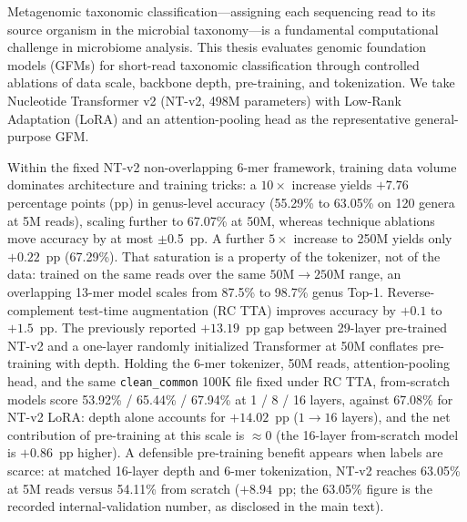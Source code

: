 \begin{abstract*}

    Metagenomic taxonomic classification---assigning each sequencing read to its source organism in the microbial taxonomy---is a fundamental computational challenge in microbiome analysis. This thesis evaluates genomic foundation models (GFMs) for short-read taxonomic classification through controlled ablations of data scale, backbone depth, pre-training, and tokenization. We take Nucleotide Transformer v2 (NT-v2, 498M parameters) with Low-Rank Adaptation (LoRA) and an attention-pooling head as the representative general-purpose GFM.

    Within the fixed NT-v2 non-overlapping 6-mer framework, training data volume dominates architecture and training tricks: a $10\times$ increase yields $+7.76$ percentage points (pp) in genus-level accuracy (55.29\% to 63.05\% on 120 genera at 5M reads), scaling further to 67.07\% at 50M, whereas technique ablations move accuracy by at most $\pm$0.5~pp. A further $5\times$ increase to 250M yields only $+0.22$~pp (67.29\%). That saturation is a property of the tokenizer, not of the data: trained on the same reads over the same $50\text{M}\to250\text{M}$ range, an overlapping 13-mer model scales from 87.5\% to 98.7\% genus Top-1. Reverse-complement test-time augmentation (RC TTA) improves accuracy by $+0.1$ to $+1.5$~pp. The previously reported $+13.19$~pp gap between 29-layer pre-trained NT-v2 and a one-layer randomly initialized Transformer at 50M conflates pre-training with depth. Holding the 6-mer tokenizer, 50M reads, attention-pooling head, and the same \texttt{clean\_common} 100K file fixed under RC TTA, from-scratch models score 53.92\% / 65.44\% / 67.94\% at 1 / 8 / 16 layers, against 67.08\% for NT-v2 LoRA: depth alone accounts for $+14.02$~pp ($1\to 16$ layers), and the net contribution of pre-training at this scale is $\approx 0$ (the 16-layer from-scratch model is $+0.86$~pp higher). A defensible pre-training benefit appears when labels are scarce: at matched 16-layer depth and 6-mer tokenization, NT-v2 reaches 63.05\% at 5M reads versus 54.11\% from scratch ($+8.94$~pp; the 63.05\% figure is the recorded internal-validation number, as disclosed in the main text).


\end{abstract*}

